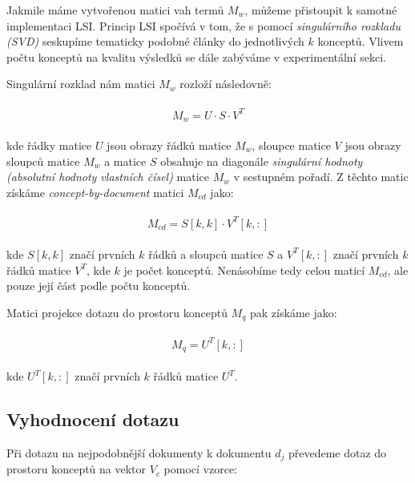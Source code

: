 \documentclass[11pt]{scrartcl} %
\begin{document}
Jakmile máme vytvořenou matici vah termů $M_w$, můžeme přistoupit k samotné implementaci LSI. Princip LSI spočívá v tom, že s pomocí \emph{singulárního rozkladu (SVD)} seskupíme tematicky podobné články do jednotlivých $k$ konceptů. Vlivem počtu konceptů na kvalitu výsledků se dále zabýváme v experimentální sekci.

\bigskip 

Singulární rozklad nám matici $M_w$ rozloží následovně:

\begin{align}
	\begin{split}
		M_w = U \cdot S \cdot V^T
	\end{split}					
\end{align}

kde řádky matice $U$ jsou obrazy řádků matice $M_w$, sloupce matice $V$ jsou obrazy sloupců matice $M_w$ a matice $S$ obsahuje na diagonále \emph{singulární hodnoty (absolutní hodnoty vlastních čísel)} matice $M_w$ v sestupném pořadí. Z těchto matic získáme \emph{concept-by-document} matici $M_{cd}$ jako:

\begin{align}
	\begin{split}
		M_{cd} = S[k,k] \cdot V^T[k,:]
	\end{split}					
\end{align}

kde $S[k,k]$ značí prvních $k$ řádků a sloupců matice $S$ a $V^T[k,:]$ značí prvních $k$ řádků matice $V^T$, kde $k$ je počet konceptů. Nenásobíme tedy celou maticí $M_{cd}$, ale pouze její část podle počtu konceptů.

\bigskip

Matici projekce dotazu do prostoru konceptů $M_q$ pak získáme jako:

\begin{align}
	\begin{split}
		M_q = U^T[k,:]
	\end{split}					
\end{align}

kde $U^T[k,:]$ značí prvních $k$ řádků matice $U^T$.

\subsection{Vyhodnocení dotazu}

Při dotazu na nejpodobnější dokumenty k dokumentu $d_j$ převedeme dotaz do prostoru konceptů na vektor $V_c$ pomocí vzorce:
\end{document}
